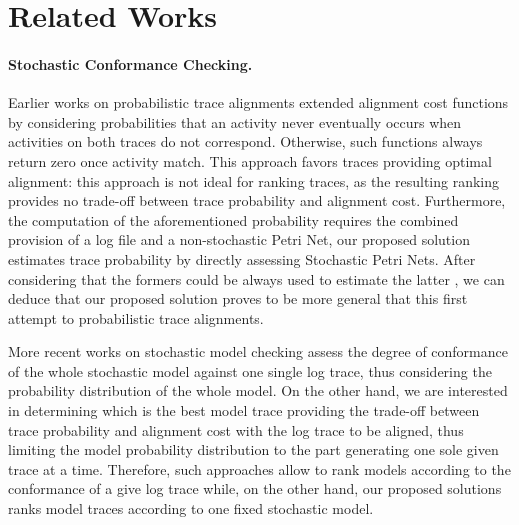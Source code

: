 \section{Related Works}
\paragraph*{Stochastic Conformance Checking.} Earlier works on probabilistic trace alignments \cite{AlizadehLZ14a} extended alignment cost functions by considering probabilities that an activity never eventually occurs when activities on both traces do not correspond. Otherwise, such functions always return zero once activity match. This approach favors traces providing optimal alignment: this approach is not ideal for ranking traces, as the resulting ranking provides no trade-off between trace probability and alignment cost. Furthermore, the computation of the aforementioned probability requires the combined provision of a log file and a non-stochastic Petri Net, our proposed solution estimates trace probability by directly assessing Stochastic Petri Nets. After considering that the formers could be always used to estimate the latter \cite{spdwe}, we can deduce that our proposed solution proves to be more general that this first attempt to probabilistic trace alignments. 

More recent works on stochastic model checking \cite{DBLP:conf/icpm/PolyvyanyyK19,DBLP:journals/tosem/PolyvyanyySWCM20} assess the degree of conformance of the whole stochastic model against one single log trace, thus considering the probability distribution of the whole model. On the other hand, we are interested in determining which is the best model trace providing the trade-off between trace probability and alignment cost with the log trace to be aligned, thus limiting the model probability distribution to the part generating one sole given trace at a time. Therefore, such approaches allow to rank models according to the conformance of a give log trace while, on the other hand, our proposed solutions ranks model traces according to one fixed stochastic model. 

 
